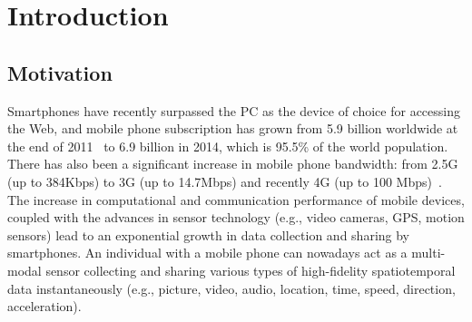 \documentclass{USC-Thesis}
\numberwithin{equation}{chapter}
\begin{document}


\mainmatter

\newtheorem{lemma}{Lemma}

\chapter{Introduction}\label{ch.intro}
\section{Motivation}

Smartphones have recently surpassed the PC as the device of choice for accessing the Web, and mobile phone subscription has grown from 5.9 billion worldwide at the end of 2011~\cite{mobile2014mobile} to 6.9 billion in 2014, which is 95.5\% of the world population. There has also been a significant increase in mobile phone bandwidth: from 2.5G (up to 384Kbps) to 3G (up to 14.7Mbps) and recently 4G (up to 100 Mbps)~\cite{sauter2009mobile}.
The increase in computational and communication performance of mobile devices, coupled with the advances in sensor technology (e.g., video cameras, GPS, motion sensors) lead to an exponential growth in data collection and sharing by smartphones. An individual with a mobile phone can nowadays act as a multi-modal sensor collecting and sharing various types of high-fidelity spatiotemporal data instantaneously (e.g., picture, video, audio, location, time, speed, direction, acceleration).
\end{document}
